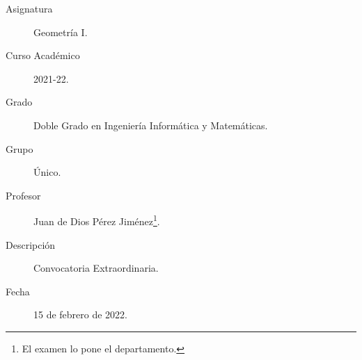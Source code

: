 \documentclass[12pt]{article}
\begin{document}

    
    

    \begin{description}
        \item[Asignatura] Geometría I.
        \item[Curso Académico] 2021-22.
        \item[Grado] Doble Grado en Ingeniería Informática y Matemáticas.
        \item[Grupo] Único.
        \item[Profesor] Juan de Dios Pérez Jiménez\footnote{El examen lo pone el departamento.}.
        \item[Descripción] Convocatoria Extraordinaria.
        \item[Fecha] 15 de febrero de 2022.
    
    \end{description}
    \newpage
    
\end{document}
